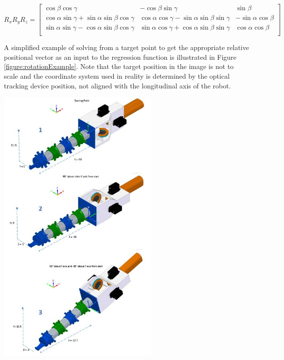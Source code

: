 \documentclass[11pt]{article}
\begin{document}
\begin{center}
\[
R_{x}R_{y}R_{z} = 
\begin{bmatrix*}
\cos\beta\cos\gamma & -\cos\beta\sin\gamma & \sin\beta \\
\cos\alpha\sin\gamma + \sin\alpha\sin\beta\cos\gamma & \cos\alpha\cos\gamma - \sin\alpha\sin\beta\sin\gamma & -\sin\alpha\cos\beta \\
\sin\alpha\sin\gamma - \cos\alpha\sin\beta\cos\gamma & \sin\alpha\cos\gamma + \cos\alpha\sin\beta\sin\gamma & \cos\alpha\cos\beta \\
\end{bmatrix*}
\]
\label{equation:rotationMatrix}
\end{center}

A simplified example of solving from a target point to get the appropriate relative positional vector as an input to the regression function is illustrated in Figure \ref{figure:rotationExample}. Note that the target position in the image is not to scale and the coordinate system used in reality is determined by the optical tracking device position, not aligned with the longitudinal axis of the robot. 


\begin{center}
\includegraphics[width=0.6\textwidth]{images/rotationExampleAll.jpg}
\label{figure:rotationExample}
\end{center}
\end{document}
